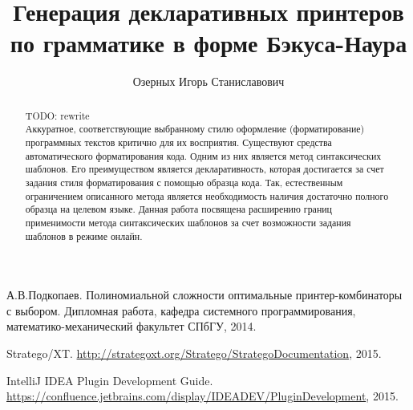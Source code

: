 \title{Генерация декларативных принтеров по грамматике в форме Бэкуса-Наура}


\author{Озерных Игорь Станиславович}



\maketitle             

\begin{abstract}
TODO: rewrite \\
Аккуратное, соответствующие выбранному стилю оформление (форматирование)
программных текстов критично для их восприятия.
Существуют средства автоматического форматирования кода. Одним
из них является метод синтаксических шаблонов. Его преимуществом является декларативность, которая
достигается за счет задания стиля форматирования с помощью образца кода. Так, естественным ограничением
описанного метода является необходимость наличия достаточно полного образца на целевом языке.
Данная работа посвящена расширению границ применимости метода синтаксических шаблонов
за счет возможности задания шаблонов в режиме онлайн.
\end{abstract}









\begin{thebibliography}{99}
  А.В.Подкопаев. Полиномиальной сложности оптимальные принтер-комбинаторы с выбором.
  Дипломная работа, кафедра системного программирования, математико-механический факультет СПбГУ, 2014.

  Stratego/XT. \url{http://strategoxt.org/Stratego/StrategoDocumentation}, 2015.

  IntelliJ IDEA Plugin Development Guide. \url{https://confluence.jetbrains.com/display/IDEADEV/PluginDevelopment},
  2015.
\end{thebibliography}

